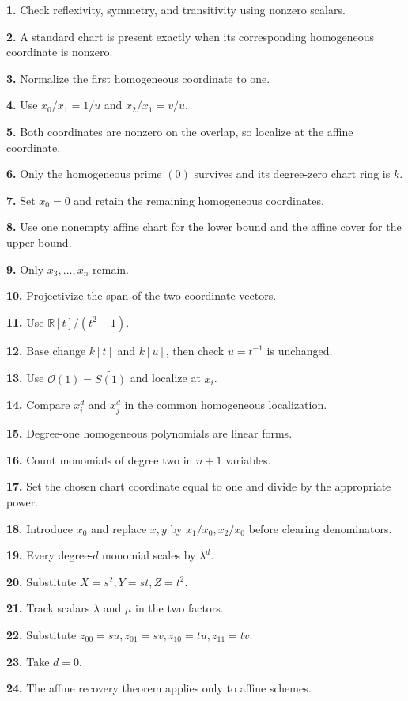 \textbf{1.} Check reflexivity, symmetry, and transitivity using nonzero scalars.

\textbf{2.} A standard chart is present exactly when its corresponding homogeneous coordinate is nonzero.

\textbf{3.} Normalize the first homogeneous coordinate to one.

\textbf{4.} Use \(x_0/x_1=1/u\) and \(x_2/x_1=v/u\).

\textbf{5.} Both coordinates are nonzero on the overlap, so localize at the affine coordinate.

\textbf{6.} Only the homogeneous prime \((0)\) survives and its degree-zero chart ring is \(k\).

\textbf{7.} Set \(x_0=0\) and retain the remaining homogeneous coordinates.

\textbf{8.} Use one nonempty affine chart for the lower bound and the affine cover for the upper bound.

\textbf{9.} Only \(x_3,\ldots,x_n\) remain.

\textbf{10.} Projectivize the span of the two coordinate vectors.

\textbf{11.} Use \(\mathbb R[t]/(t^2+1)\).

\textbf{12.} Base change \(k[t]\) and \(k[u]\), then check \(u=t^{-1}\) is unchanged.

\textbf{13.} Use \(\mathcal O(1)=\widetilde{S(1)}\) and localize at \(x_i\).

\textbf{14.} Compare \(x_i^d\) and \(x_j^d\) in the common homogeneous localization.

\textbf{15.} Degree-one homogeneous polynomials are linear forms.

\textbf{16.} Count monomials of degree two in \(n+1\) variables.

\textbf{17.} Set the chosen chart coordinate equal to one and divide by the appropriate power.

\textbf{18.} Introduce \(x_0\) and replace \(x,y\) by \(x_1/x_0,x_2/x_0\) before clearing denominators.

\textbf{19.} Every degree-\(d\) monomial scales by \(\lambda^d\).

\textbf{20.} Substitute \(X=s^2,Y=st,Z=t^2\).

\textbf{21.} Track scalars \(\lambda\) and \(\mu\) in the two factors.

\textbf{22.} Substitute \(z_{00}=su,z_{01}=sv,z_{10}=tu,z_{11}=tv\).

\textbf{23.} Take \(d=0\).

\textbf{24.} The affine recovery theorem applies only to affine schemes.